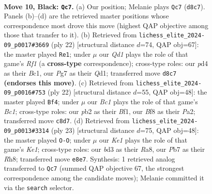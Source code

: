 \documentclass[11pt]{article}
\begin{document}
\clearpage

\begin{figure}[p]\centering
\begin{subfigure}{0.46\textwidth}\centering
\resizebox{\linewidth}{!}{%
\newchessgame
\chessboard[
  setfen={r1bqkb1r/pp3ppp/2p1p3/3nN3/3P4/3BP3/PP3PPP/R1BQK2R b KQkq - 1 10},
  showmover=false,
  pgfstyle=straightmove, color=movearrow, markmove={d8-c7}
]}
\caption{}
\end{subfigure}\hfill
\begin{subfigure}{0.46\textwidth}\centering
\resizebox{\linewidth}{!}{%
\newchessgame
\chessboard[
  setfen={r1bqk2r/1p3pp1/p2bp2p/3n4/3N4/2PB4/PP3PPP/R1BQ1RK1 w kq - 1 12},
  showmover=false,
  pgfstyle=straightmove, color=movearrow, markmove={f1-e1}
]}
\caption{}
\end{subfigure}
\\[4pt]
\begin{subfigure}{0.46\textwidth}\centering
\resizebox{\linewidth}{!}{%
\newchessgame
\chessboard[
  setfen={r3kb1r/ppqb1ppp/4p3/2Ppn3/1P1N4/2P5/P4PPP/R1BQKB1R w KQkq - 0 12},
  showmover=false,
  pgfstyle=straightmove, color=movearrow, markmove={c1-f4}
]}
\caption{}
\end{subfigure}\hfill
\begin{subfigure}{0.46\textwidth}\centering
\resizebox{\linewidth}{!}{%
\newchessgame
\chessboard[
  setfen={r1bqk2r/1p1nbppp/p2p4/3Pp3/P1N5/4B3/1PP2PPP/R2QKB1R b KQkq - 3 12},
  showmover=false,
  pgfstyle=straightmove, color=movearrow, markmove={e8-g8}
]}
\caption{}
\end{subfigure}
\caption{\textbf{Move 10, Black: \texttt{Qc7}.} (a) Our position; Melanie plays \texttt{Qc7} (\texttt{d8c7}). Panels (b)--(d) are the retrieved master positions whose correspondence most drove this move (highest QAP objective among those that transfer to it). (b) Retrieved from \texttt{lichess\_elite\_2024-09\_p0017\#3669} (ply 22) [structural distance $d$=74, QAP obj=67]: the master played \texttt{Re1}; under $\mu$ our \emph{Qd1} plays the role of that game's \emph{Rf1} (a \textbf{cross-type} correspondence); cross-type roles: our \emph{p}d4 as their \emph{B}c1, our \emph{P}g7 as their \emph{Q}d1; transferred move \texttt{d8c7} \textbf{(endorses this move)}. (c) Retrieved from \texttt{lichess\_elite\_2024-09\_p0016\#753} (ply 22) [structural distance $d$=55, QAP obj=48]: the master played \texttt{Bf4}; under $\mu$ our \emph{Bc1} plays the role of that game's \emph{Bc1}; cross-type roles: our \emph{p}b2 as their \emph{B}f1, our \emph{B}f8 as their \emph{P}a2; transferred move \texttt{c8d7}. (d) Retrieved from \texttt{lichess\_elite\_2024-09\_p0013\#3314} (ply 23) [structural distance $d$=75, QAP obj=48]: the master played \texttt{O-O}; under $\mu$ our \emph{Ke1} plays the role of that game's \emph{Ke1}; cross-type roles: our \emph{b}d3 as their \emph{R}a8, our \emph{P}b7 as their \emph{R}h8; transferred move \texttt{e8e7}. Synthesis: 1 retrieved analog transferred to \texttt{Qc7} (summed QAP objective 67, the strongest correspondence among the candidate moves); Melanie committed it via the \texttt{search} selector.}
\label{fig:thought-m19}
\end{figure}
\end{document}
